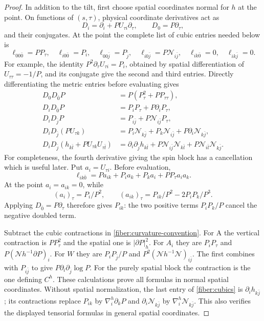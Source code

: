 \begin{proof}
In addition to the tilt, first choose spatial coordinates normal for
\(h\) at the point.  On functions of \((s,\tau)\), physical coordinate
derivatives act as
\[
 D_i=\partial_i+P U_{\tau i}\partial_\tau,
 \qquad D_0=P\partial_\tau,
\]
and their conjugates.  At the point the complete list of cubic entries
needed below is
\begin{equation}\label{fiber:cubics}
 \ell_{00\bar0}=PP_\tau,\quad
 \ell_{i0\bar0}=P_i,\quad
 \ell_{00\bar j}=P_{\bar j},\quad
 \ell_{i0\bar j}=P\mathcal N_{i\bar j},\quad
 \ell_{ik\bar0}=0,\quad \ell_{ik\bar j}=0.
\end{equation}
For example, the identity
\(P^2\partial_\tau U_{\tau i}=P_i\), obtained by spatial
differentiation of \(U_{\tau\tau}=-1/P\), and its conjugate give the
second and third entries.
Directly differentiating the metric entries before evaluating gives
\begin{align*}
 D_0D_{\bar0}P&=P(P_\tau^2+PP_{\tau\tau}),\\
 D_iD_{\bar0}P&=P_iP_\tau+P\partial_iP_\tau,\\
 D_iD_{\bar j}P&=P_{i\bar j}+P\mathcal N_{i\bar j}P_\tau,\\
 D_iD_{\bar j}(PU_{\tau k})
   &=P_i\mathcal N_{k\bar j}+P_k\mathcal N_{i\bar j}
      +P\partial_i\mathcal N_{k\bar j},\\
 D_iD_{\bar j}(h_{k\bar l}+PU_{\tau k}U_{\tau\bar l})
   &=\partial_i\partial_{\bar j}h_{k\bar l}
      +P\mathcal N_{i\bar j}\mathcal N_{k\bar l}
      +P\mathcal N_{i\bar l}\mathcal N_{k\bar j}.
\end{align*}
For completeness, the fourth derivative giving the spin block has a
cancellation which is useful later.  Put \(a_i=U_{\tau i}\).  Before
evaluation,
\[
 \ell_{ik\bar0}=Pa_{ik}+P_i a_k+P_k a_i+PP_\tau a_i a_k.
\]
At the point \(a_i=a_{ik}=0\), while
\[
 (a_i)_\tau=P_i/P^2,\qquad
 (a_{ik})_\tau=P_{ik}/P^2-2P_iP_k/P^3.
\]
Applying \(D_{\bar0}=P\partial_\tau\) therefore gives \(P_{ik}\):
the two positive terms \(P_iP_k/P\) cancel the negative doubled term.

Subtract the cubic contractions in
\eqref{fiber:curvature-convention}.  For A the vertical contraction is
\(PP_\tau^2\) and the spatial one is \(|\partial P|_h^2\).
For \(A_i\) they are \(P_iP_\tau\) and
\(P(\mathcal Nh^{-1}\partial P)_i\).  For \(W\) they are
\(P_iP_{\bar j}/P\) and \(P^2(\mathcal Nh^{-1}\mathcal N)_{i\bar j}\).
The first combines with \(P_{i\bar j}\) to give
\(P\partial_i\partial_{\bar j}\log P\).
For the purely spatial block the contraction is the one defining
\(C^h\).  These calculations prove all formulas in normal spatial
coordinates.  Without spatial normalization, the last entry of
\eqref{fiber:cubics} is \(\partial_i h_{k\bar j}\); its contractions
replace \(P_{ik}\) by \(\nabla^h_i\partial_kP\) and
\(\partial_i\mathcal N_{k\bar j}\) by
\(\nabla_i^h\mathcal N_{k\bar j}\).  This also verifies the displayed
tensorial formulas in general spatial coordinates.
\end{proof}

